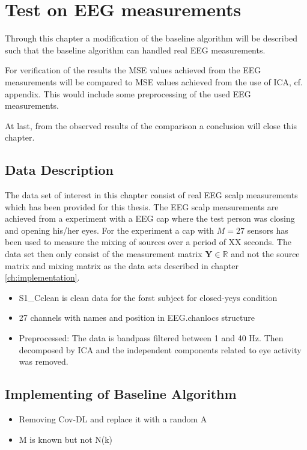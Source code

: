 \chapter{Test on EEG measurements}
Through this chapter a modification of the baseline algorithm will be described such that the baseline algorithm can handled real EEG measurements. 

For verification of the results the MSE values achieved from the EEG measurements will be compared to MSE values achieved from the use of ICA, cf. appendix. This would include some preprocessing of the used EEG measurements.

At last, from the observed results of the comparison a conclusion will close this chapter.

\section{Data Description}
The data set of interest in this chapter consist of real EEG scalp measurements which has been provided for this thesis. The EEG scalp measurements are achieved from a experiment with a EEG cap where the test person was closing and opening his/her eyes. For the experiment a cap with $M = 27$ sensors has been used to measure the mixing of sources over a period of XX seconds. The data set then only consist of the measurement matrix $\mathbf{Y} \in \mathbb{R}$ and not the source matrix and mixing matrix as the data sets described in chapter \ref{ch:implementation}.



\begin{itemize}
\item S1\_Cclean is clean data for the forst subject for closed-yeys condition
\item 27 channels with names and position in EEG.chanlocs structure 
\item Preprocessed: The data is bandpass filtered between 1 and 40 Hz. Then decomposed by ICA and the independent components related to eye activity was removed.
\end{itemize}
\section{Implementing of Baseline Algorithm}
\begin{itemize}
\item Removing Cov-DL and replace it with a random A
\item M is known but not N(k)
\end{itemize}

